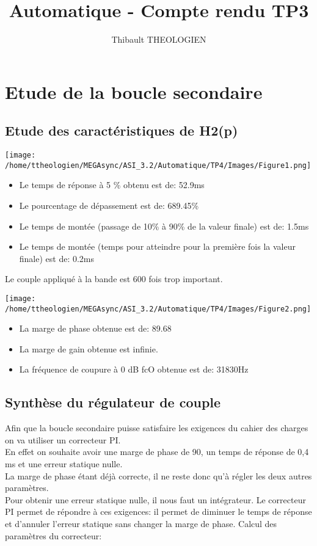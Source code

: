 \documentclass[a4paper,12pt]{article}
\title{Automatique - Compte rendu TP3}
\author{Thibault THEOLOGIEN}
\begin{document}
	\maketitle
	\tableofcontents
	\newpage

	\section{Etude de la boucle secondaire}
		\subsection{Etude des caractéristiques de H2(p)}
			\begin{center}
				\texttt{[image: /home/ttheologien/MEGAsync/ASI\_3.2/Automatique/TP4/Images/Figure1.png]}
			\end{center}

			\begin{itemize}
				\item Le temps de réponse à 5 \% obtenu est de: 52.9ms
				\item Le pourcentage de dépassement est de: 689.45\%
				\item Le temps de montée (passage de 10\% à 90\% de la valeur finale) est de: 1.5ms
				\item Le temps de montée (temps pour atteindre pour la première fois la valeur finale) est de: 0.2ms
			\end{itemize}

			Le couple appliqué à la bande est 600 fois trop important.

			\begin{center}
				\texttt{[image: /home/ttheologien/MEGAsync/ASI\_3.2/Automatique/TP4/Images/Figure2.png]}
			\end{center}

			\begin{itemize}
				\item La marge de phase obtenue est de: 89.68\degre
				\item La marge de gain obtenue est infinie.
				\item La fréquence de coupure à 0 dB fcO obtenue est de: 31830Hz
			\end{itemize}

		\subsection{Synthèse du régulateur de couple}
			Afin que la boucle secondaire puisse satisfaire les exigences du cahier des charges on va utiliser un correcteur PI.\\
			En effet on souhaite avoir une marge de phase de 90\degre, un temps de réponse de 0,4 ms et une erreur statique nulle. \\
			La marge de phase étant déjà correcte, il ne reste donc qu'à régler les deux autres paramètres. \\
			Pour obtenir une erreur statique nulle, il nous faut un intégrateur. Le correcteur PI permet de répondre à ces exigences: il permet de diminuer le temps de réponse et d'annuler l'erreur statique sans changer la marge de phase.
			\newpage
			Calcul des paramètres du correcteur:
\end{document}
